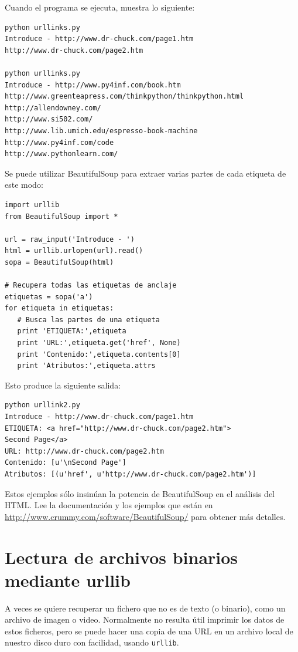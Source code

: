 Cuando el programa se ejecuta, muestra lo siguiente:

\beforeverb
\begin{verbatim}
python urllinks.py 
Introduce - http://www.dr-chuck.com/page1.htm
http://www.dr-chuck.com/page2.htm

python urllinks.py 
Introduce - http://www.py4inf.com/book.htm
http://www.greenteapress.com/thinkpython/thinkpython.html
http://allendowney.com/
http://www.si502.com/
http://www.lib.umich.edu/espresso-book-machine
http://www.py4inf.com/code
http://www.pythonlearn.com/
\end{verbatim}
\afterverb
%
Se puede utilizar BeautifulSoup para extraer varias partes de cada
etiqueta de este modo:

\beforeverb
\begin{verbatim}
import urllib
from BeautifulSoup import *

url = raw_input('Introduce - ')
html = urllib.urlopen(url).read()
sopa = BeautifulSoup(html)

# Recupera todas las etiquetas de anclaje
etiquetas = sopa('a')
for etiqueta in etiquetas:
   # Busca las partes de una etiqueta
   print 'ETIQUETA:',etiqueta
   print 'URL:',etiqueta.get('href', None)
   print 'Contenido:',etiqueta.contents[0]
   print 'Atributos:',etiqueta.attrs
\end{verbatim}
\afterverb
%
Esto produce la siguiente salida:

\beforeverb
\begin{verbatim}
python urllink2.py 
Introduce - http://www.dr-chuck.com/page1.htm
ETIQUETA: <a href="http://www.dr-chuck.com/page2.htm">
Second Page</a>
URL: http://www.dr-chuck.com/page2.htm
Contenido: [u'\nSecond Page']
Atributos: [(u'href', u'http://www.dr-chuck.com/page2.htm')]
\end{verbatim}
\afterverb
%
Estos ejemplos sólo insinúan la potencia de BeautifulSoup
en el análisis del HTML. Lee la documentación y
los ejemplos que están en
\url{http://www.crummy.com/software/BeautifulSoup/} para obtener más detalles.

\section{Lectura de archivos binarios mediante urllib}

A veces se quiere recuperar un fichero que no es de texto (o binario), como
un archivo de imagen o video. Normalmente no resulta útil imprimir los datos de
estos ficheros, pero se puede hacer una copia de una URL en un archivo
local de nuestro disco duro con facilidad, usando {\tt urllib}.

